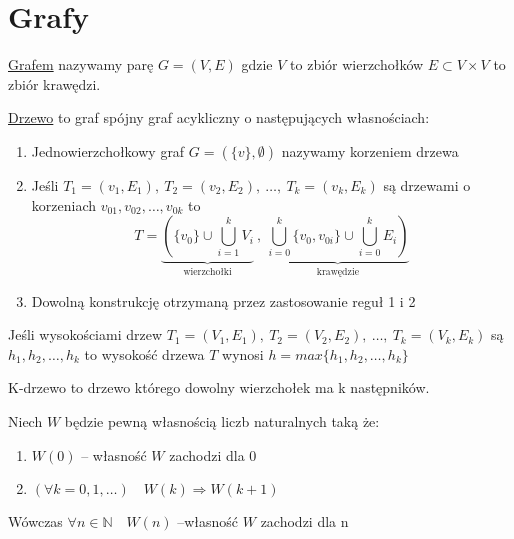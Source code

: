 \section{Grafy}
	
	\begin{df}
		\href{http://pl.wikipedia.org/wiki/Graf_(matematyka)}{Grafem} nazywamy parę $G = (V, E)$ gdzie $V$ to zbiór wierzchołków 
		$E \subset V \times V$ to zbiór krawędzi.
	\end{df}	

	\begin{df}
		\href{http://pl.wikipedia.org/wiki/Drzewo_(matematyka)}{Drzewo} to graf spójny graf acykliczny o następujących własnościach:
		\begin{enumerate}
			\item Jednowierzchołkowy graf $G = (\{v\}, \emptyset)$ nazywamy korzeniem drzewa
			\item Jeśli $T_1 = (v_1, E_1), ~ T_2 = (v_2, E_2), ~\dots ,~ T_k = (v_k, E_k)$ są drzewami o korzeniach $v_{01}, v_{02}, \dots, v_{0k}$
			to $$T = \underbrace{ \left(\{v_0\} \cup \bigcup^k_{i=1}V_i \right. }_\text{wierzchołki} ~,~
					\underbrace{ \left. \bigcup_{i=0}^k \{v_0, v_{0i}\} \cup \bigcup_{i=0}^k E_i \right) }_\text{krawędzie}$$
			\item Dowolną konstrukcję otrzymaną przez zastosowanie reguł 1 i 2
		\end{enumerate}			
	\end{df}
	
	\begin{df}
		Jeśli wysokościami drzew $T_1 = (V_1, E_1), ~ T_2 = (V_2, E_2), ~\dots ,~ T_k = (V_k, E_k)$ są $h_1, h_2, \dots , h_k$ to
		wysokość drzewa $T$ wynosi $h = max\{h_1, h_2, \dots , h_k\}$
	\end{df}
	
	\begin{df}
		K-drzewo to drzewo którego dowolny wierzchołek ma k następników.
	\end{df}
	
	\begin{df}
		Niech $W$ będzie pewną własnością liczb naturalnych taką że:
		\begin{enumerate}
			\item $W(0)$ -- własność $W$ zachodzi dla $0$
			\item $(\forall k=0, 1, \dots) \quad W(k) \Rightarrow W(k+1)$ 
		\end{enumerate}
		Wówczas $\forall n \in \mathbb{N} \quad W(n)$ --własność $W$ zachodzi dla n
	\end{df}
	

